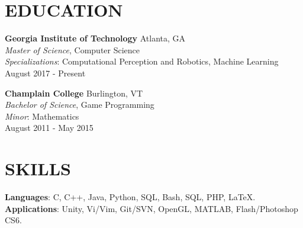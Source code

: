 \documentclass[margin]{res}
\begin{document}
\begin{resume}

\section{EDUCATION}
\phantom{spacing}
\textbf{Georgia Institute of Technology} \hfill Atlanta, GA\\
{\sl Master of Science}, Computer Science
\\
{\sl Specializations}: Computational Perception and Robotics, Machine Learning
\\
August 2017 - Present

\par
\textbf{Champlain College} \hfill Burlington, VT\\
{\sl Bachelor of Science}, Game Programming
\\
{\sl Minor}: Mathematics
\\
August 2011 - May 2015


\section{SKILLS}
\phantom{spacing}
\textbf{Languages}: C, C++, Java, Python, SQL, Bash, SQL, PHP, \LaTeX.
\\
\textbf{Applications}: Unity, Vi/Vim, Git/SVN, OpenGL, MATLAB, Flash/Photoshop CS6. 


\end{resume}
\end{document}
